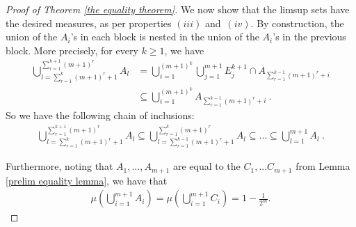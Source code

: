 \documentclass[12pt]{article}
\begin{document}
\begin{proof}[Proof of Theorem \ref{the equality theorem}]
We now show that the limsup sets have the desired measures, as per properties $(iii)$ and~$(iv)$.
By construction, the union of the $A_i$'s in each block is nested in the union of the $A_i$'s in the previous block. More precisely, for every $k \geq 1$, we have 
     \begin{align*}
        \bigcup_{l=\sum_{r=1}^{k} (m+1)^{r}+1}^{\sum_{r=1}^{k+1} (m+1)^{r}} A_l &= \bigcup_{i=1}^{(m+1)^{k}} \bigcup_{j=1}^{m+1} E_j^{k+1} \cap A_{\sum_{r=1}^{k-1} (m+1)^r+i}  \\
        &\subseteq \bigcup_{i=1}^{(m+1)^{k}} A_{\sum_{r=1}^{k-1}(m+1)^r+i} ~.
    \end{align*}
    So we have the following chain of inclusions:
    \begin{align} \label{nesting}
        \bigcup_{l=\sum_{r=1}^{k} (m+1)^{r}+1}^{\sum_{r=1}^{k+1} (m+1)^{r}} A_l \subseteq \bigcup_{l=\sum_{r=1}^{k-1} (m+1)^{r}+1}^{\sum_{r=1}^{k}(m+1)^{r}} A_l \subseteq  ... \subseteq \bigcup_{l=1}^{m+1} A_l ~.%
    \end{align}

Furthermore, noting that $A_1,...,A_{m+1}$ are equal to the $C_1,...C_{m+1}$ from Lemma \ref{prelim equality lemma}, we have that
\begin{align*}
    \mu\left( \bigcup_{i=1}^{m+1} A_i \right)=\mu\left( \bigcup_{i=1}^{m+1} C_i \right)=1-\frac{1}{2^m}.
\end{align*}



\end{proof}
\end{document}
